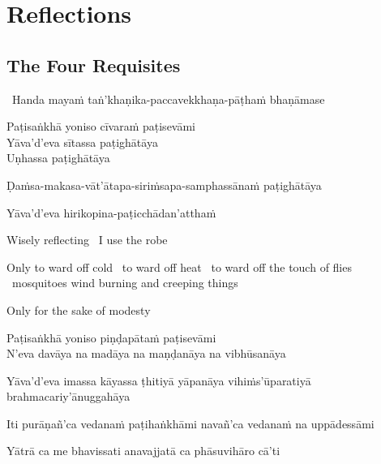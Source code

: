 
\ifdigitalversion
\else
\fi

\chapter{Reflections}



\section{The Four Requisites}
\label{four-requisites}

\begin{leader}
  \anglebracketleft\ \hspace{-0.5mm}Handa mayaṁ taṅ'khaṇika-paccavekkhaṇa-pāṭhaṁ bhaṇāmase \hspace{-0.5mm}\anglebracketright\
\end{leader}

Paṭisaṅkhā yoniso cīvaraṁ paṭisevāmi\\
Yāva'd'eva sītassa paṭighātāya\\
Uṇhassa paṭighātāya\\
\begin{pali-hang-together}
Ḍaṁsa-makasa-vāt'ātapa-siriṁsapa-samphassānaṁ paṭighātāya\\
\end{pali-hang-together}
\begin{pali-hang-together}
Yāva'd'eva hirikopina-paṭicchādan'atthaṁ
\end{pali-hang-together}

\begin{english-keep-with}
  Wisely reflecting \breathmark\ I use the robe
  \begin{english-hang-together}
    Only to ward off cold \breathmark\ to ward off heat \breathmark\ to ward off the touch of flies \breathmark\ mosquitoes wind burning and creeping things
  \end{english-hang-together}
  Only for the sake of modesty
\end{english-keep-with}

Paṭisaṅkhā yoniso piṇḍapātaṁ paṭisevāmi\\
N'eva davāya na madāya na maṇḍanāya na vibhūsanāya
\begin{pali-hang-together}
  Yāva'd'eva imassa kāyassa ṭhitiyā yāpanāya vihiṁs'ūparatiyā brahmacariy'ānuggahāya
\end{pali-hang-together}
\begin{pali-hang-together}
  Iti purāṇañ'ca vedanaṁ paṭihaṅkhāmi navañ'ca vedanaṁ na uppādessāmi
\end{pali-hang-together}
Yātrā ca me bhavissati anavajjatā ca phāsuvihāro cā'ti

